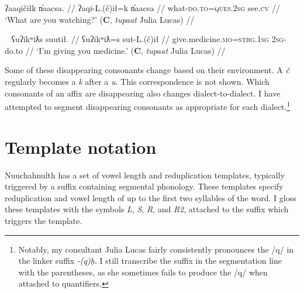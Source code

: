\ex \label{ex:whatwatching}
\begingl
\glpreamble ʔaaqičiłk n̓aacsa. //
\gla ʔaqi-L.(č)ił=k n̓aacsa //
\glb what-\textsc{do.to}=\textsc{ques.2sg} see.\textsc{cv} //
\glft `What are you watching?' (\textbf{C}, \textit{tupaat} Julia Lucas) //
\endgl
\xe

\ex~ \label{ex:givemedicine}
\begingl
\glpreamble ʕuʔikʷiƛs suutił. //
\gla ʕuʔikʷiƛ\footnotemark=s sut-L.(č)ił //
\glb give.medicine.\textsc{mo}=\textsc{strg.1sg} \textsc{2sg}-do.to //
\glft `I'm giving you medicine.' (\textbf{C}, \textit{tupaat} Julia Lucas) //
\endgl
\xe


Some of these disappearing consonants change based on their environment. A \textit{č} regularly becomes a \textit{k} after a \textit{u}. This correspondence is not shown. Which consonants of an affix are disappearing also changes dialect-to-dialect. I have attempted to segment disappearing consonants as appropriate for each dialect.\footnote{Notably, my consultant Julia Lucas fairly consistently pronounces the /q/ in the linker suffix \textit{-(q)ḥ}. I still transcribe the suffix in the segmentation line with the parentheses, as she sometimes fails to produce the /q/ when attached to quantifiers.}

\section{Template notation}

Nuuchahnulth has a set of vowel length and reduplication templates, typically triggered by a suffix containing segmental phonology. These templates specify reduplication and vowel length of up to the first two syllables of the word. I gloss these templates with the symbols \textit{L}, \textit{S}, \textit{R}, and \textit{R2}, attached to the suffix which triggers the template. %

